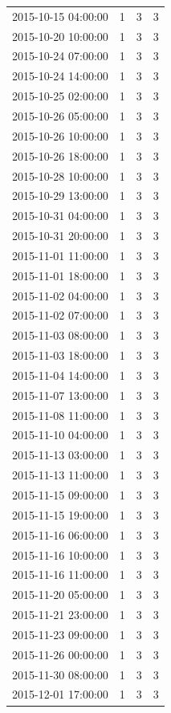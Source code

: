 \begin{tabular}{lrrr}
2015-10-15 04:00:00 & 1 & 3 & 3 \\
2015-10-20 10:00:00 & 1 & 3 & 3 \\
2015-10-24 07:00:00 & 1 & 3 & 3 \\
2015-10-24 14:00:00 & 1 & 3 & 3 \\
2015-10-25 02:00:00 & 1 & 3 & 3 \\
2015-10-26 05:00:00 & 1 & 3 & 3 \\
2015-10-26 10:00:00 & 1 & 3 & 3 \\
2015-10-26 18:00:00 & 1 & 3 & 3 \\
2015-10-28 10:00:00 & 1 & 3 & 3 \\
2015-10-29 13:00:00 & 1 & 3 & 3 \\
2015-10-31 04:00:00 & 1 & 3 & 3 \\
2015-10-31 20:00:00 & 1 & 3 & 3 \\
2015-11-01 11:00:00 & 1 & 3 & 3 \\
2015-11-01 18:00:00 & 1 & 3 & 3 \\
2015-11-02 04:00:00 & 1 & 3 & 3 \\
2015-11-02 07:00:00 & 1 & 3 & 3 \\
2015-11-03 08:00:00 & 1 & 3 & 3 \\
2015-11-03 18:00:00 & 1 & 3 & 3 \\
2015-11-04 14:00:00 & 1 & 3 & 3 \\
2015-11-07 13:00:00 & 1 & 3 & 3 \\
2015-11-08 11:00:00 & 1 & 3 & 3 \\
2015-11-10 04:00:00 & 1 & 3 & 3 \\
2015-11-13 03:00:00 & 1 & 3 & 3 \\
2015-11-13 11:00:00 & 1 & 3 & 3 \\
2015-11-15 09:00:00 & 1 & 3 & 3 \\
2015-11-15 19:00:00 & 1 & 3 & 3 \\
2015-11-16 06:00:00 & 1 & 3 & 3 \\
2015-11-16 10:00:00 & 1 & 3 & 3 \\
2015-11-16 11:00:00 & 1 & 3 & 3 \\
2015-11-20 05:00:00 & 1 & 3 & 3 \\
2015-11-21 23:00:00 & 1 & 3 & 3 \\
2015-11-23 09:00:00 & 1 & 3 & 3 \\
2015-11-26 00:00:00 & 1 & 3 & 3 \\
2015-11-30 08:00:00 & 1 & 3 & 3 \\
2015-12-01 17:00:00 & 1 & 3 & 3 \\

\end{tabular}
